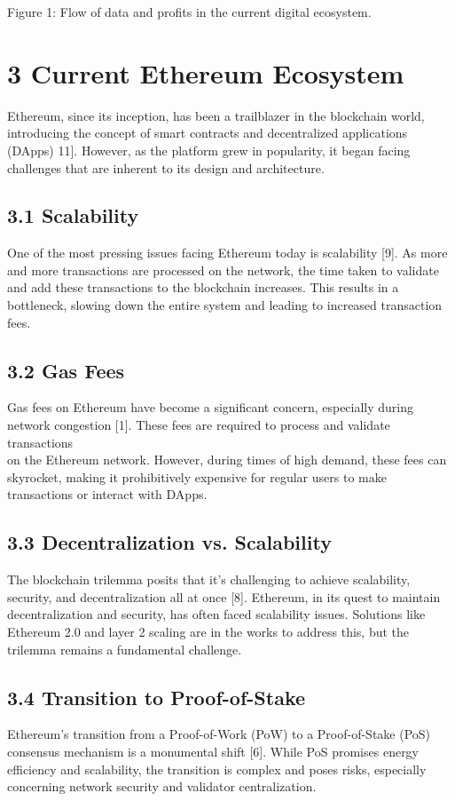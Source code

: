 \documentclass[10pt]{article}
\begin{document}
Figure 1: Flow of data and profits in the current digital ecosystem.

\section*{3 Current Ethereum Ecosystem}
Ethereum, since its inception, has been a trailblazer in the blockchain world, introducing the concept of smart contracts and decentralized applications (DApps) 11]. However, as the platform grew in popularity, it began facing challenges that are inherent to its design and architecture.

\subsection*{3.1 Scalability}
One of the most pressing issues facing Ethereum today is scalability [9]. As more and more transactions are processed on the network, the time taken to validate and add these transactions to the blockchain increases. This results in a bottleneck, slowing down the entire system and leading to increased transaction fees.

\subsection*{3.2 Gas Fees}
Gas fees on Ethereum have become a significant concern, especially during network congestion [1]. These fees are required to process and validate transactions\\
on the Ethereum network. However, during times of high demand, these fees can skyrocket, making it prohibitively expensive for regular users to make transactions or interact with DApps.

\subsection*{3.3 Decentralization vs. Scalability}
The blockchain trilemma posits that it's challenging to achieve scalability, security, and decentralization all at once [8]. Ethereum, in its quest to maintain decentralization and security, has often faced scalability issues. Solutions like Ethereum 2.0 and layer 2 scaling are in the works to address this, but the trilemma remains a fundamental challenge.

\subsection*{3.4 Transition to Proof-of-Stake}
Ethereum's transition from a Proof-of-Work (PoW) to a Proof-of-Stake (PoS) consensus mechanism is a monumental shift [6]. While PoS promises energy efficiency and scalability, the transition is complex and poses risks, especially concerning network security and validator centralization.
\end{document}
